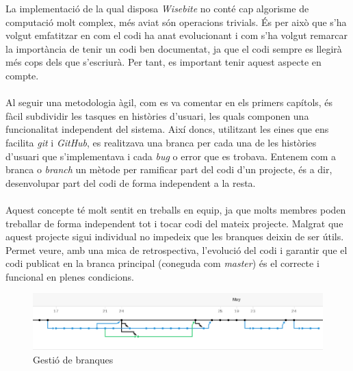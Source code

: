 La implementació de la qual disposa \textit{Wisebite} no conté cap algorisme de computació molt complex, més aviat són operacions trivials. És per això que s'ha volgut emfatitzar en com el codi ha anat evolucionant i com s'ha volgut remarcar la importància de tenir un codi ben documentat, ja que el codi sempre es llegirà més cops dels que s'escriurà. Per tant, es important tenir aquest aspecte en compte.
\\\\
Al seguir una metodologia àgil, com es va comentar en els primers capítols, és fàcil subdividir les tasques en històries d'usuari, les quals componen una funcionalitat independent del sistema. Així doncs, utilitzant les eines que ens facilita \textit{git} i \textit{GitHub}, es realitzava una branca per cada una de les històries d'usuari que s'implementava i cada \textit{bug} o error que es trobava. Entenem com a branca o \textit{branch} un mètode per ramificar part del codi d'un projecte, és a dir, desenvolupar part del codi de forma independent a la resta.
\\\\
Aquest concepte té molt sentit en treballs en equip, ja que molts membres poden treballar de forma independent tot i tocar codi del mateix projecte. Malgrat que aquest projecte sigui individual no impedeix que les branques deixin de ser útils. Permet veure, amb una mica de retrospectiva, l'evolució del codi i garantir que el codi publicat en la branca principal (coneguda com \textit{master}) és el correcte i funcional en plenes condicions.
\\
\begin{figure}[H]
\includegraphics[scale=0.435]{Figures/branches.png}
\caption{Gestió de branques}
\end{figure}


